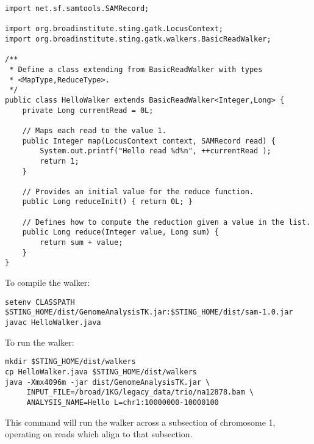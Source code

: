 \documentclass[11pt,fullpage]{article}
\begin{document}
\begin{verbatim}
import net.sf.samtools.SAMRecord;

import org.broadinstitute.sting.gatk.LocusContext;
import org.broadinstitute.sting.gatk.walkers.BasicReadWalker;

/**
 * Define a class extending from BasicReadWalker with types
 * <MapType,ReduceType>.  
 */
public class HelloWalker extends BasicReadWalker<Integer,Long> {
    private Long currentRead = 0L;

    // Maps each read to the value 1.
    public Integer map(LocusContext context, SAMRecord read) {
        System.out.printf("Hello read %d%n", ++currentRead );
        return 1; 
    }

    // Provides an initial value for the reduce function.
    public Long reduceInit() { return 0L; }
    
    // Defines how to compute the reduction given a value in the list. 
    public Long reduce(Integer value, Long sum) { 
        return sum + value;
    }
}
\end{verbatim}
To compile the walker:
\begin{verbatim}
setenv CLASSPATH $STING_HOME/dist/GenomeAnalysisTK.jar:$STING_HOME/dist/sam-1.0.jar
javac HelloWalker.java
\end{verbatim}
To run the walker:
\begin{verbatim}
mkdir $STING_HOME/dist/walkers
cp HelloWalker.java $STING_HOME/dist/walkers
java -Xmx4096m -jar dist/GenomeAnalysisTK.jar \
     INPUT_FILE=/broad/1KG/legacy_data/trio/na12878.bam \
     ANALYSIS_NAME=Hello L=chr1:10000000-10000100
\end{verbatim}
This command will run the walker across a subsection of chromosome 1, operating on 
reads which align to that subsection.  
\end{document}
